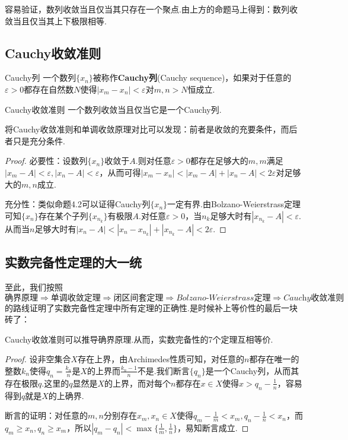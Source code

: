 \documentclass[lang=cn, zihao=5]{elegantbook}
\begin{document}
容易验证，数列收敛当且仅当其只存在一个聚点.由上方的命题马上得到：数列收敛当且仅当其上下极限相等.

\subsection{Cauchy收敛准则}

\begin{definition}{Cauchy列}
	一个数列$\{ x_n \}$被称作\textbf{Cauchy列}(Cauchy sequence)，如果对于任意的$\varepsilon >0$都存在自然数$N$使得$|x_m-x_n|<\varepsilon$对$m,n>N$恒成立.
\end{definition}

\begin{theorem}{Cauchy收敛准则}
	一个数列收敛当且仅当它是一个Cauchy列.
\end{theorem}
\begin{remark}
	将Cauchy收敛准则和单调收敛原理对比可以发现：前者是收敛的充要条件，而后者只是充分条件.
\end{remark}
\begin{proof}
	必要性：设数列$\{ x_n \}$收敛于$A$.则对任意$\varepsilon >0$都存在足够大的$m,m$满足$|x_m-A|<\varepsilon ,|x_n-A|<\varepsilon$，从而可得$|x_m-x_n|<|x_m-A|+|x_n-A|<2\varepsilon$对足够大的$m,n$成立.
	
	充分性：类似命题4.2可以证得Cauchy列$\{ x_n \}$一定有界.由Bolzano-Weierstrass定理可知$\{ x_n \}$存在某个子列$\{ x_{n_k} \}$有极限$A$.对任意$\varepsilon >0$，当$n_k$足够大时有$|x_{n_k} - A|<\varepsilon$.从而当$n$足够大时有$|x_n-A|<|x_n-x_{n_k}|+|x_{n_k}-A|<2\varepsilon$.
\end{proof}

\subsection{实数完备性定理的大一统}

至此，我们按照$$\textit{确界原理} \Rightarrow \textit{单调收敛定理} \Rightarrow \textit{闭区间套定理} \Rightarrow \textit{Bolzano-Weierstrass定理} \Rightarrow \textit{Cauchy收敛准则}$$的路线证明了实数完备性定理中所有定理的正确性.是时候补上等价性的最后一块砖了：

\begin{proposition}
	Cauchy收敛准则可以推导确界原理.从而，实数完备性的7个定理互相等价.
\end{proposition}
\begin{proof}
	设非空集合$X$存在上界，由Archimedes性质可知，对任意的$n$都存在唯一的整数$k_n$使得$q_n=\frac{k_n}{n}$是$X$的上界而$\frac{k_n-1}{n}$不是.我们断言$\{ q_n \}$是一个Cauchy列，从而其存在极限$q$.这里的$q$显然是$X$的上界，而对每个$n$都存在$x \in X$使得$x>q_n-\frac{1}{n}$，容易得到$q$就是$X$的上确界.
	
	断言的证明：对任意的$m,n$分别存在$x_m,x_n \in X$使得$q_m-\frac{1}{m} < x_m,q_n-\frac{1}{n} < x_n$，而$q_m \geq x_n,q_n \geq x_m$，所以$|q_m-q_n|<\max \{ \frac{1}{m},\frac{1}{n} \}$，易知断言成立.
\end{proof}
\end{document}
